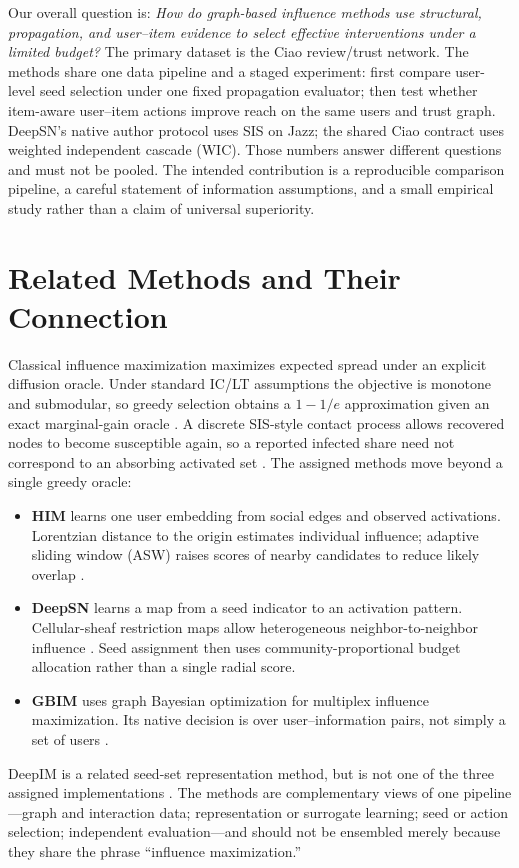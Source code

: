 \documentclass[10pt,twocolumn]{article}
\begin{document}
Our overall question is: \emph{How do graph-based influence methods use structural, propagation, and user--item evidence to select effective interventions under a limited budget?} The primary dataset is the Ciao review/trust network. The methods share one data pipeline and a staged experiment: first compare user-level seed selection under one fixed propagation evaluator; then test whether item-aware user--item actions improve reach on the same users and trust graph. DeepSN's native author protocol uses SIS on Jazz; the shared Ciao contract uses weighted independent cascade (WIC). Those numbers answer different questions and must not be pooled. The intended contribution is a reproducible comparison pipeline, a careful statement of information assumptions, and a small empirical study rather than a claim of universal superiority.

\section{Related Methods and Their Connection}
Classical influence maximization maximizes expected spread under an explicit diffusion oracle. Under standard IC/LT assumptions the objective is monotone and submodular, so greedy selection obtains a $1-1/e$ approximation given an exact marginal-gain oracle \cite{kempe}. A discrete SIS-style contact process allows recovered nodes to become susceptible again, so a reported infected share need not correspond to an absorbing activated set \cite{pastor}. The assigned methods move beyond a single greedy oracle:
\begin{itemize}
  \item \textbf{HIM} learns one user embedding from social edges and observed activations. Lorentzian distance to the origin estimates individual influence; adaptive sliding window (ASW) raises scores of nearby candidates to reduce likely overlap \cite{him}.
  \item \textbf{DeepSN} learns a map from a seed indicator to an activation pattern. Cellular-sheaf restriction maps allow heterogeneous neighbor-to-neighbor influence \cite{hansen,bodnar,deepsn}. Seed assignment then uses community-proportional budget allocation rather than a single radial score.
  \item \textbf{GBIM} uses graph Bayesian optimization for multiplex influence maximization. Its native decision is over user--information pairs, not simply a set of users \cite{gbim}.
\end{itemize}
DeepIM is a related seed-set representation method, but is not one of the three assigned implementations \cite{deepim}. The methods are complementary views of one pipeline---graph and interaction data; representation or surrogate learning; seed or action selection; independent evaluation---and should not be ensembled merely because they share the phrase ``influence maximization.''
\end{document}
